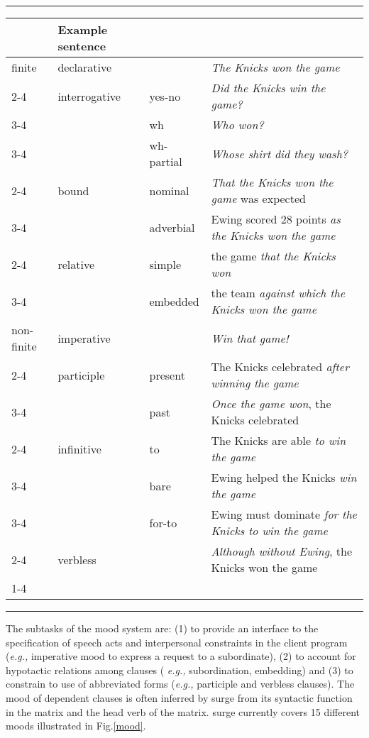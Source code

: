\begin{figure*} [t]
\rule[.3cm]{\textwidth}{.01in}
\small
\begin{tabular}{|l|l|l|l|}\hline
\m{3}{|l|}{\bf Mood features} & {\bf Example sentence}\\\hline
finite & declarative & & {\em The Knicks won the game}\\\cline{2-4}
& interrogative & yes-no & {\em Did the Knicks win the game?}\\\cline{3-4}
& & wh & {\em Who won?}\\\cline{3-4}
& & wh-partial & {\em Whose shirt did they wash?}\\\cline{2-4}
& bound & nominal & {\em That the Knicks won the game} was
expected\\\cline{3-4} 
& & adverbial & Ewing scored 28 points {\em as the Knicks won the
game}\\\cline{2-4}
& relative & simple & the game {\em that the Knicks won}\\\cline{3-4}
& & embedded & the team {\em against which the Knicks won the game}\\\hline
non-finite & imperative & & {\em Win that game!}\\\cline{2-4}
& participle & present & The Knicks celebrated {\em after winning the
game}\\\cline{3-4} 
& & past & {\em Once the game won}, the Knicks celebrated\\\cline{2-4} 
& infinitive & to & The Knicks are able {\em to win the game}\\\cline{3-4}
& & bare & Ewing helped the Knicks {\em win the game}\\\cline{3-4}
& & for-to & Ewing must dominate {\em for the Knicks to win the
game}\\\cline{2-4} 
& verbless & & {\em Although without Ewing}, the Knicks won the
game\\\cline{1-4}  
\end{tabular}
\caption{Mood hierarchy}
\label{mood}
\rule{\textwidth}{.01in}
\end{figure*}

The subtasks of the mood system are: (1) to provide an interface to the
specification of speech acts and interpersonal constraints in the client
program ({\em e.g.,} imperative mood to express a request to a
subordinate), (2) to account for hypotactic relations among clauses ({\em
  e.g.,} subordination, embedding) and (3) to constrain to use of
abbreviated forms ({\em e.g.,} participle and verbless clauses). The mood
of dependent clauses is often inferred by {\sc surge} from its syntactic
function in the matrix and the head verb of the matrix.  {\sc surge}
currently covers 15 different moods illustrated in Fig.\ref{mood}.

